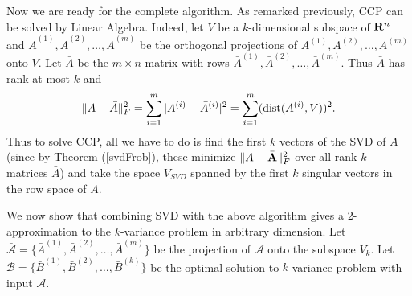 \documentclass{book}
\numberwithin{exercise}{chapter}
\begin{document}
\begin{center}
\end{center}
Now we are ready for the complete algorithm.
As remarked previously, CCP can be solved by Linear Algebra. Indeed, let $V$ be a $k$-dimensional subspace
of ${\bf R}^n$ and $\bar{A}^{(1)},\bar{A}^{(2)},\ldots,\bar{A}^{(m)}$ be the orthogonal projections of
${A}^{(1)},{A}^{(2)},\ldots,{A}^{(m)}$ onto $V$. Let $\bar{A}$ be the $m\times n$ matrix with
rows $\bar{A}^{(1)},\bar{A}^{(2)},\ldots,\bar{A}^{(m)}$. Thus $\bar{A}$ has rank at most $k$
and
$$\|A-\bar{A}\|_F^2=\sum_{i=1}^m |A^{(i)}-\bar{A}^{(i)}|^2=
\sum_{i=1}^m (\hbox{dist} (A^{(i)},V))^2.$$
Thus to solve CCP, all we have to do is find the first $k$ vectors of the
SVD of $A$ (since by Theorem (\ref{svdFrob}), these
minimize $\|A-\bar{{\bf A}}\|_F^2$ over all rank $k$ matrices $\bar {A}$)
and take the space $V_{SVD}$ spanned
by the first $k$ singular vectors in the row space of $A$.

We now show that combining SVD with the above algorithm gives a $2$-approximation to the $k$-variance problem in arbitrary dimension.
Let $\bar{{\mathcal A}}=\{\bar{A}^{(1)},\bar{A}^{(2)},\ldots,\bar{A}^{(m)}\}$ be the projection of ${\mathcal A}$
onto the subspace $V_{k}$. Let $\bar{{\mathcal B}}=\{\bar{B}^{(1)},\bar{B}^{(2)},\ldots,\bar{B}^{(k)}\}$
be the optimal solution to $k$-variance problem with input $\bar{{\mathcal A}}$.
\end{document}
